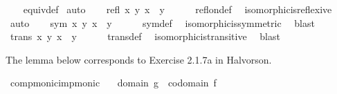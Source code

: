 \begin{isabellebody}
%
\isadelimproof
\ \ %
\endisadelimproof
%
\isatagproof
{}\isamarkupfalse%
\ equiv{\isacharunderscore}{\kern0pt}def\isanewline
{}\isamarkupfalse%
\ auto\isanewline
\ \ \isamarkupfalse%
\ {\isachardoublequoteopen}refl\ {\isacharbraceleft}{\kern0pt}{\isacharparenleft}{\kern0pt}x{\isacharcomma}{\kern0pt}\ y{\isacharparenright}{\kern0pt}{\isachardot}{\kern0pt}\ x\ {\isasymcong}\ y{\isacharbraceright}{\kern0pt}{\isachardoublequoteclose}\isanewline
\ \ \ \ \isamarkupfalse%
\ refl{\isacharunderscore}{\kern0pt}on{\isacharunderscore}{\kern0pt}def\ \isamarkupfalse%
\ isomorphic{\isacharunderscore}{\kern0pt}is{\isacharunderscore}{\kern0pt}reflexive\ \isamarkupfalse%
\ auto\isanewline
{}\isamarkupfalse%
\isanewline
\ \ \isamarkupfalse%
\ {\isachardoublequoteopen}sym\ {\isacharbraceleft}{\kern0pt}{\isacharparenleft}{\kern0pt}x{\isacharcomma}{\kern0pt}\ y{\isacharparenright}{\kern0pt}{\isachardot}{\kern0pt}\ x\ {\isasymcong}\ y{\isacharbraceright}{\kern0pt}{\isachardoublequoteclose}\isanewline
\ \ \ \ \isamarkupfalse%
\ sym{\isacharunderscore}{\kern0pt}def\ \isamarkupfalse%
\ isomorphic{\isacharunderscore}{\kern0pt}is{\isacharunderscore}{\kern0pt}symmetric\ \isamarkupfalse%
\ blast\isanewline
{}\isamarkupfalse%
\isanewline
\ \ \isamarkupfalse%
\ {\isachardoublequoteopen}trans\ {\isacharbraceleft}{\kern0pt}{\isacharparenleft}{\kern0pt}x{\isacharcomma}{\kern0pt}\ y{\isacharparenright}{\kern0pt}{\isachardot}{\kern0pt}\ x\ {\isasymcong}\ y{\isacharbraceright}{\kern0pt}{\isachardoublequoteclose}\isanewline
\ \ \ \ \isamarkupfalse%
\ trans{\isacharunderscore}{\kern0pt}def\ \isamarkupfalse%
\ isomorphic{\isacharunderscore}{\kern0pt}is{\isacharunderscore}{\kern0pt}transitive\ \isamarkupfalse%
\ blast\isanewline
{}\isamarkupfalse%
%
\endisatagproof
{\isafoldproof}%
%
\isadelimproof
%
\endisadelimproof
%
\begin{isamarkuptext}%
The lemma below corresponds to Exercise 2.1.7a in Halvorson.%
\end{isamarkuptext}\isamarkuptrue%
\isamarkupfalse%
\ comp{\isacharunderscore}{\kern0pt}monic{\isacharunderscore}{\kern0pt}imp{\isacharunderscore}{\kern0pt}monic{\isacharcolon}{\kern0pt}\isanewline
\ \ \ {\isachardoublequoteopen}domain\ g\ {\isacharequal}{\kern0pt}\ codomain\ f{\isachardoublequoteclose}\isanewline

\end{isabellebody}
